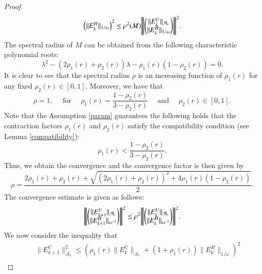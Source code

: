 \documentclass{article}
\newcommand{\vertiii}[1]{{\left\vert\kern-0.25ex\left\vert\kern-0.25ex\left\vert #1 
    \right\vert\kern-0.25ex\right\vert\kern-0.25ex\right\vert}}
\theoremstyle{definition}
\begin{document}
\begin{proof}
\begin{equation}
{\begin{pmatrix}
\|E^H_{k}\|_{1/\omega} \end{pmatrix}}^2 \leq \rho^2(M) \vertiii{ 
\begin{pmatrix} \|E^U_{k}\|_{\mathcal{A}_r} \\
\|E^H_{k}\|_{1/\omega} \end{pmatrix}}^2. 
\end{equation}
The spectral radius of $M$ can be obtained from the following characteristic polynomial roots: 
\begin{equation}
\lambda^2 - (2\rho_1(r) + \rho_2(r))\lambda - \rho_1(r) (1 - \rho_2(r)) = 0. 
\end{equation} 
It is clear to see that the spectral radius $\rho$ is an increasing function of $\rho_1(r)$ for any fixed $\rho_2(r) \in [0,1]$. Moreover, we have that
\begin{equation}
\rho = 1, \quad \mbox{ for } \quad \rho_1(r) = \frac{1 - \rho_2(r)}{3 -\rho_2(r)} \quad \mbox{ and } \quad \rho_2(r) \in [0,1]. 
\end{equation} 
Note that the Assumption \ref{param} guarantees the following holds that 
the contraction factors $\rho_1(r)$ and $\rho_2(r)$ satisfy the compatibility condition (see Lemma \ref{compatibility}): 
\begin{equation}\label{cond:main}
\rho_1(r) < \frac{1 - \rho_2(r)}{3 - \rho_2(r)}. 
\end{equation}
Thus, we obtain the convergence and the convergence factor is then given by 
\begin{equation}
\rho = \frac{2\rho_1(r) + \rho_2(r) + \sqrt{ (2\rho_1(r) + \rho_2(r))^2 + 4\rho_1(r)(1-\rho_2(r))}}{2}. 
\end{equation} 
The convergence estimate is given as follows: 
\begin{eqnarray*}
\vertiii{\begin{pmatrix} \|E_{k+1}^U\|_{\mathcal{A}_r} \\ \|E_{k+1}^H\|_{\omega^{-1}} \end{pmatrix}}^2 \leq \rho^{2} 
\vertiii{\begin{pmatrix} \|E_k^U\|_{\mathcal{A}_r} \\
\|E_k^H\|_{\omega^{-1}} \end{pmatrix}}^2.  
\end{eqnarray*}
We now consider the inequality that 
\begin{eqnarray*}
&& \|E^U_{k+1}\|_{\mathcal{A}_r}^2 \leq \left ( \rho_1(r) \|E_k^U\|_{\mathcal{A}_r} + (1 + \rho_1(r)) \|E_k^H\|_{1/\omega} \right )^2 \\

\end{eqnarray*}
\end{proof}
\end{document}
